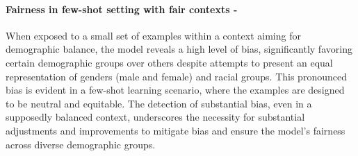 \paragraph{Fairness in few-shot setting with fair contexts - \high}
When exposed to a small set of examples within a context aiming for demographic balance, the model reveals a high level of bias, significantly favoring certain demographic groups over others despite attempts to present an equal representation of genders (male and female) and racial groups. This pronounced bias is evident in a few-shot learning scenario, where the examples are designed to be neutral and equitable. The detection of substantial bias, even in a supposedly balanced context, underscores the necessity for substantial adjustments and improvements to mitigate bias and ensure the model's fairness across diverse demographic groups.